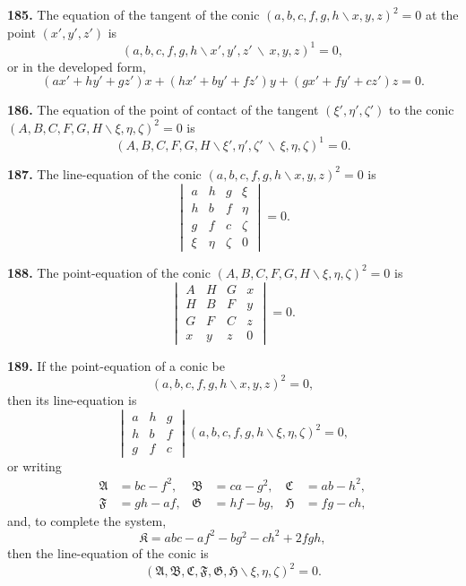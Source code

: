 \documentclass[11pt,a4paper]{article}
\begin{document}
\textbf{185.} The equation of the tangent of the conic
$(a,b,c,f,g,h\!\backslash x,y,z)^2=0$ at the point $(x',y',z')$ is
\[
(a,b,c,f,g,h\!\backslash x',y',z'\,\backslash\,x,y,z)^1=0,
\]
or in the developed form,
\[
(ax'+hy'+gz')x + (hx'+by'+fz')y + (gx'+fy'+cz')z = 0.
\]

\textbf{186.} The equation of the point of contact of the tangent
$(\xi',\eta',\zeta')$ to the conic
$(A,B,C,F,G,H\!\backslash \xi,\eta,\zeta)^2=0$ is
\[
(A,B,C,F,G,H\!\backslash \xi',\eta',\zeta'\,\backslash\,\xi,\eta,\zeta)^1=0.
\]

\textbf{187.} The line-equation of the conic $(a,b,c,f,g,h\!\backslash x,y,z)^2=0$ is
\[
\begin{vmatrix}
a & h & g & \xi \\
h & b & f & \eta \\
g & f & c & \zeta \\
\xi & \eta & \zeta & 0
\end{vmatrix} = 0.
\]

\textbf{188.} The point-equation of the conic $(A,B,C,F,G,H\!\backslash \xi,\eta,\zeta)^2=0$ is
\[
\begin{vmatrix}
A & H & G & x \\
H & B & F & y \\
G & F & C & z \\
x & y & z & 0
\end{vmatrix} = 0.
\]

\textbf{189.} If the point-equation of a conic be
\[
(a,b,c,f,g,h\!\backslash x,y,z)^2=0,
\]
then its line-equation is
\[
\begin{vmatrix}
a & h & g \\
h & b & f \\
g & f & c
\end{vmatrix}
(a,b,c,f,g,h\!\backslash \xi,\eta,\zeta)^2 = 0,
\]
or writing
\begin{align*}
\mathfrak{A} &= bc-f^2, & \mathfrak{B} &= ca-g^2, & \mathfrak{C} &= ab-h^2,\\
\mathfrak{F} &= gh-af, & \mathfrak{G} &= hf-bg, & \mathfrak{H} &= fg-ch,
\end{align*}
and, to complete the system,
\[
\mathfrak{K} = abc-af^2-bg^2-ch^2+2fgh,
\]
then the line-equation of the conic is
\[
(\mathfrak{A},\mathfrak{B},\mathfrak{C},\mathfrak{F},\mathfrak{G},\mathfrak{H}\!\backslash \xi,\eta,\zeta)^2 = 0.
\]
\end{document}
